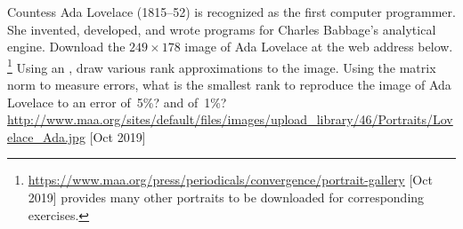 \begin{exercise} \label{ex:lovelace} 
Countess Ada Lovelace (1815--52) is recognized as the first computer programmer. She invented, developed, and wrote programs for Charles Babbage's analytical engine.
Download the \(249\times178\) image of Ada Lovelace at the web address below.%
\footnote{\protect\url{https://www.maa.org/press/periodicals/convergence/portrait-gallery} [Oct 2019] provides many other portraits to be downloaded for corresponding exercises.}
Using an \svd, draw various rank approximations to the image.
Using the matrix norm to measure errors, what is the smallest rank to reproduce the image of Ada Lovelace to an error of~5\%? and of~1\%?
\\
\url{http://www.maa.org/sites/default/files/images/upload_library/46/Portraits/Lovelace_Ada.jpg} 
[Oct 2019]
\end{exercise}









